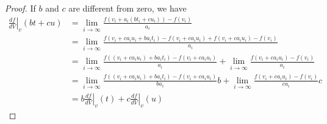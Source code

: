 \documentclass[11pt,letterpaper,fleqn]{memoir}
\begin{document}
\begin{proof}
	If $b$ and $c$ are different from zero, we have
	\begin{align*}		
	\left.\frac{df}{dV} \right|_{v} (b t + c u) &= \lim\limits_{i \to \infty} \frac{f(v_i + a_i (b t_i + c u_i)) - f(v_i)}{a_i} \\
	&= \lim\limits_{i \to \infty} \frac{f(v_i + c a_i u_i + b a_i t_i) - f(v_i + c a_i u_i) + f(v_i + c a_i u_i) - f(v_i)}{a_i} \\
	&= \lim\limits_{i \to \infty} \frac{f((v_i + c a_i u_i) + b a_i t_i) - f(v_i + c a_i u_i)}{a_i}
	+ \lim\limits_{i \to \infty} \frac{ f(v_i + c a_i u_i) - f(v_i)}{a_i} \\
	&= \lim\limits_{i \to \infty} \frac{f((v_i + c a_i u_i) + b a_i t_i) - f(v_i + c a_i u_i)}{b a_i} b
	+ \lim\limits_{i \to \infty} \frac{ f(v_i + c a_i u_i) - f(v_i)}{c a_i} c \\
	&= b \left.\frac{df}{dV} \right|_{v} (t) + c \left.\frac{df}{dV} \right|_{v} (u)
	\end{align*}
	
\end{proof}
\end{document}
